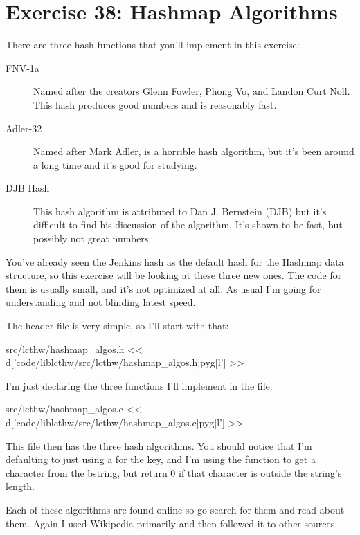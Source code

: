 \chapter{Exercise 38: Hashmap Algorithms}

There are three hash functions that you'll implement in this exercise:

\begin{description}
\item[FNV-1a] Named after the creators Glenn Fowler, Phong Vo, and Landon Curt Noll.
    This hash produces good numbers and is reasonably fast.
\item[Adler-32] Named after Mark Adler, is a horrible hash algorithm, but it's
    been around a long time and it's good for studying.
\item[DJB Hash] This hash algorithm is attributed to Dan J. Bernstein (DJB) 
    but it's difficult to find his discussion of the algorithm.  It's shown
    to be fast, but possibly not great numbers.
\end{description}

You've already seen the Jenkins hash as the default hash for the Hashmap
data structure, so this exercise will be looking at these three new ones.
The code for them is usually small, and it's not optimized at all.  As usual
I'm going for understanding and not blinding latest speed.

The header file is very simple, so I'll start with that:

\begin{code}{src/lcthw/hashmap\_algos.h}
<< d['code/liblcthw/src/lcthw/hashmap_algos.h|pyg|l'] >>
\end{code}

I'm just declaring the three functions I'll implement in the
 file:

\begin{code}{src/lcthw/hashmap\_algos.c}
<< d['code/liblcthw/src/lcthw/hashmap_algos.c|pyg|l'] >>
\end{code}

This file then has the three hash algorithms.  You should notice that
I'm defaulting to just using a  for the key, and I'm
using the  function to get a character from the bstring, but
return 0 if that character is outside the string's length.

Each of these algorithms are found online so go search for them and
read about them. Again I used Wikipedia primarily and then followed
it to other sources.

